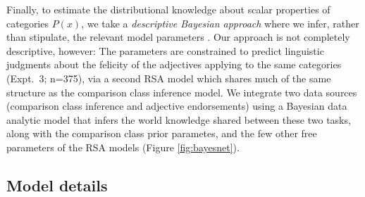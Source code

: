 \documentclass[doc]{apa6}
\begin{document}



Finally, to estimate the distributional knowledge about scalar properties of categories $P(x)$, we take a \emph{descriptive Bayesian approach}  where we infer, rather than stipulate, the relevant model parameters \cite{tauber2017}.
Our approach is not completely descriptive, however: The parameters are constrained to predict linguistic judgments about the felicity of the adjectives applying to the same categories (Expt.~3; n=375), via a second RSA model which shares much of the same structure as the comparison class inference model.
We integrate two data sources (comparison class inference and adjective endorsements) using a Bayesian data analytic model that infers the world knowledge shared between these two tasks, along with the comparison class prior parametes, and the few other free parameters of the RSA models (Figure \ref{fig:bayesnet}). 

\subsection{Model details}
\end{document}
